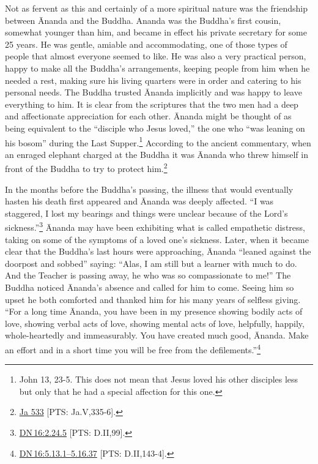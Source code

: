 \documentclass[10pt, openright]{book}
\begin{document}
Not as fervent as this and certainly of a more spiritual nature was the friendship between Ānanda and the Buddha. Ananda was the Buddha’s first cousin, somewhat younger than him, and became in effect his private secretary for some 25 years. He was gentle, amiable and accommodating, one of those types of people that almost everyone seemed to like. He was also a very practical person, happy to make all the Buddha’s arrangements, keeping people from him when he needed a rest, making sure his living quarters were in order and catering to his personal needs. The Buddha trusted Ānanda implicitly and was happy to leave everything to him. It is clear from the scriptures that the two men had a deep and affectionate appreciation for each other. Ānanda might be thought of as being equivalent to the “disciple who Jesus loved,” the one who “was leaning on his bosom” during the Last Supper.\footnote {John 13, 23-5. This does not mean that Jesus loved his other disciples less but only that he had a special affection for this one.} According to the ancient commentary, when an enraged elephant charged at the Buddha it was Ānanda who threw himself in front of the Buddha to try to protect him.\footnote {\href{https://suttacentral.net/ja533/en/francis?reference=main/pts#pts-vp-pli335}{Ja 533} [PTS: Ja.V,335-6].}


In the months before the Buddha’s passing, the illness that would eventually hasten his death first appeared and Ānanda was deeply affected. “I was staggered, I lost my bearings and things were unclear because of the Lord’s sickness.”\footnote {\href{https://suttacentral.net/dn16/en/sujato\#2.24.5}{DN 16:2.24.5} [PTS: D.II,99].} Ānanda may have been exhibiting what is called empathetic distress, taking on some of the symptoms of a loved one’s sickness. Later, when it became clear that the Buddha’s last hours were approaching, Ānanda “leaned against the doorpost and sobbed” saying: “Alas, I am still but a learner with much to do. And the Teacher is passing away, he who was so compassionate to me!” The Buddha noticed Ānanda’s absence and called for him to come. Seeing him so upset he both comforted and thanked him for his many years of selfless giving. “For a long time Ānanda, you have been in my presence showing bodily acts of love, showing verbal acts of love, showing mental acts of love, helpfully, happily, whole-heartedly and immeasurably. You have created much good, Ānanda. Make an effort and in a short time you will be free from the defilements.”\footnote {\href{https://suttacentral.net/dn16/en/sujato\#5.13.1}{DN 16:5.13.1–5.16.37} [PTS: D.II,143-4].}
\end{document}
